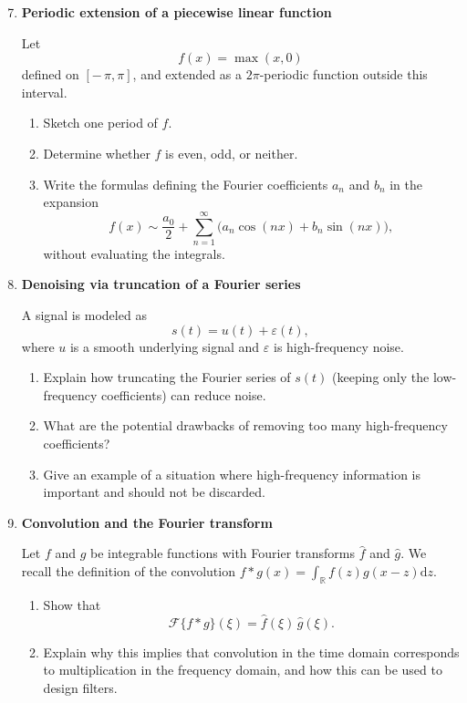 \documentclass[11pt]{article}
\begin{document}
\begin{enumerate}
\setcounter{enumi}{6} %

\item \textbf{Periodic extension of a piecewise linear function}

Let
\[
f(x)=\max(x,0)
\]
defined on \([-\,\pi,\pi]\), and extended as a \(2\pi\)-periodic function outside this interval.

\begin{enumerate}
\item Sketch one period of \(f\).
\item Determine whether \(f\) is even, odd, or neither.
\item Write the formulas defining the Fourier coefficients \(a_n\) and \(b_n\) in the expansion
\[
f(x)\sim \frac{a_0}{2} + \sum_{n=1}^{\infty}\big(a_n\cos(nx)+b_n\sin(nx)\big),
\]
without evaluating the integrals.
\end{enumerate}

\bigskip
\item \textbf{Denoising via truncation of a Fourier series}

A signal is modeled as
\[
s(t)=u(t)+\varepsilon(t),
\]
where \(u\) is a smooth underlying signal and \(\varepsilon\) is high-frequency noise.

\begin{enumerate}
\item Explain how truncating the Fourier series of \(s(t)\) (keeping only the low-frequency coefficients) can reduce noise.
\item What are the potential drawbacks of removing too many high-frequency coefficients?
\item Give an example of a situation where high-frequency information is important and should not be discarded.
\end{enumerate}

\bigskip
\item \textbf{Convolution and the Fourier transform}

Let \(f\) and \(g\) be integrable functions with Fourier transforms \(\hat f\) and \(\hat g\).
We recall the definition of the convolution \(f*g (x) = \int_{\mathbb{R}} f(z) g (x - z) \mathrm{d}z\).
\begin{enumerate}
\item Show that
\[
\mathcal{F}\{f*g\}(\xi)=\hat f(\xi)\,\hat g(\xi).
\]
\item Explain why this implies that convolution in the time domain corresponds to multiplication in the frequency domain, and how this can be used to design filters.
\end{enumerate}


\end{enumerate}
\end{document}
